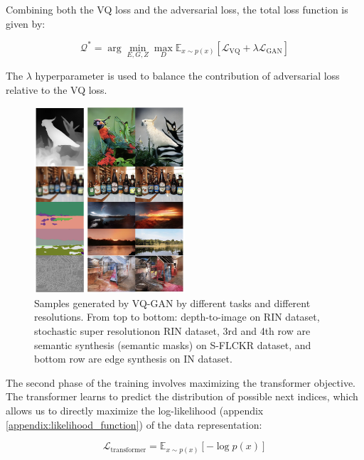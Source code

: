 Combining both the VQ loss and the adversarial loss, the total loss function is given by:

\begin{equation}
    \mathcal{Q^*} = \arg \min_{E, G, Z} \max_D \mathbb{E}_{x \sim p(x)} [\mathcal{L}_{\text{VQ}} + \lambda \mathcal{L}_{\text{GAN}}]
\end{equation}

The $\lambda$ hyperparameter is used to balance the contribution of adversarial loss relative to the VQ loss.

\begin{figure}
    \centering
    \includegraphics[width=0.5\textwidth]{images/vqgan_samples2.png}
    \caption[Caption for LOF]{Samples generated by VQ-GAN by different tasks and different resolutions. From top to bottom: depth-to-image on RIN dataset, stochastic super resolution\footnotemark on RIN dataset, 3rd and 4th row are semantic synthesis (semantic masks) on S-FLCKR dataset, and bottom row are edge synthesis on IN dataset.}
\end{figure}



The second phase of the training involves maximizing the transformer objective. The transformer learns to predict the distribution of possible next indices, which allows us to directly maximize the log-likelihood (appendix \ref{appendix:likelihood_function}) of the data representation:

\begin{equation}
    \mathcal{L}_{\text{transformer}} = \mathbb{E}_{x \sim p(x)} [- \log p(x)]
\end{equation}

